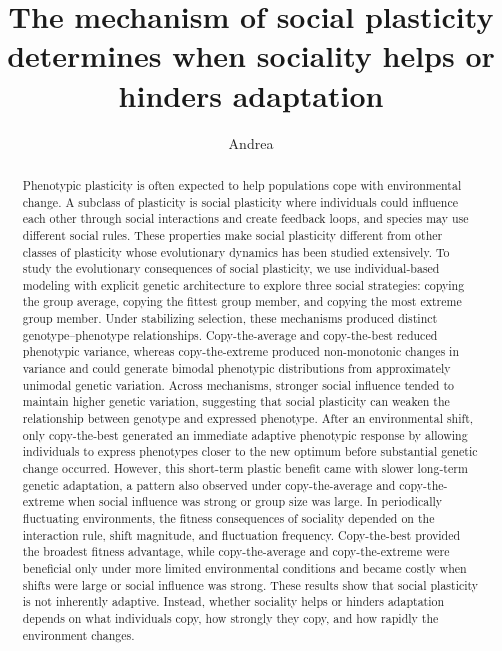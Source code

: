 \documentclass{article}
\title{The mechanism of social plasticity determines when sociality helps or hinders adaptation}
\author{Andrea}
\begin{document}
\maketitle

\begin{abstract}
Phenotypic plasticity is often expected to help populations cope with environmental change. A subclass of plasticity is social plasticity where individuals could influence each other through social interactions and create feedback loops, and species may use different social rules. These properties make social plasticity different from other classes of plasticity whose evolutionary dynamics has been studied extensively. To study the evolutionary consequences of social plasticity, we use individual-based modeling with explicit genetic architecture to explore three social strategies: copying the group average, copying the fittest group member, and copying the most extreme group member. Under stabilizing selection, these mechanisms produced distinct genotype–phenotype relationships. Copy-the-average and copy-the-best reduced phenotypic variance, whereas copy-the-extreme produced non-monotonic changes in variance and could generate bimodal phenotypic distributions from approximately unimodal genetic variation. Across mechanisms, stronger social influence tended to maintain higher genetic variation, suggesting that social plasticity can weaken the relationship between genotype and expressed phenotype. After an environmental shift, only copy-the-best generated an immediate adaptive phenotypic response by allowing individuals to express phenotypes closer to the new optimum before substantial genetic change occurred. However, this short-term plastic benefit came with slower long-term genetic adaptation, a pattern also observed under copy-the-average and copy-the-extreme when social influence was strong or group size was large. In periodically fluctuating environments, the fitness consequences of sociality depended on the interaction rule, shift magnitude, and fluctuation frequency. Copy-the-best provided the broadest fitness advantage, while copy-the-average and copy-the-extreme were beneficial only under more limited environmental conditions and became costly when shifts were large or social influence was strong. These results show that social plasticity is not inherently adaptive. Instead, whether sociality helps or hinders adaptation depends on what individuals copy, how strongly they copy, and how rapidly the environment changes.

\end{abstract}
\end{document}
